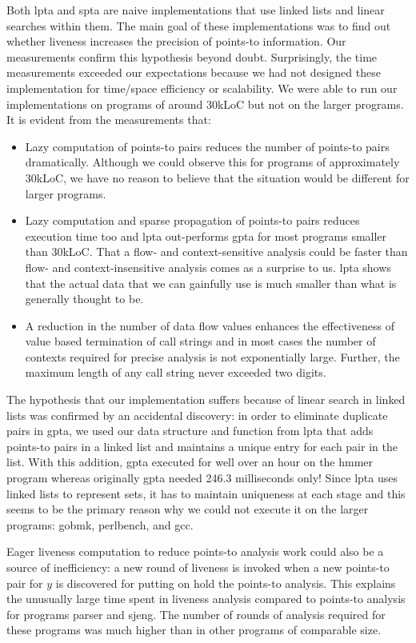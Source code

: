 \documentclass{llncs}
\begin{document}
Both lpta and spta are naive implementations that use linked lists and
linear searches within them.
The main goal of these implementations
was to find out whether liveness increases the precision of points-to
information. Our measurements confirm this hypothesis beyond doubt.
Surprisingly, the time measurements exceeded our expectations because we
had not designed these implementation for time/space efficiency or
scalability. We were able to run our implementations on programs of
around 30kLoC but not on the larger programs. It is evident from the
measurements that:
\begin{itemize}
\item Lazy computation of points-to pairs reduces the number of 
      points-to pairs dramatically. Although we
      could observe this for programs of approximately 30kLoC, we have no 
      reason to believe that the situation would be different for larger programs.
\item Lazy computation and sparse propagation of points-to pairs reduces 
      execution time too and lpta out-performs gpta for most programs smaller than 30kLoC.
      That a flow- and context-sensitive analysis could be faster than
      flow- and context-insensitive analysis comes as a surprise to
      us. lpta shows that the actual data that we can gainfully use is
      much smaller than what is generally thought to be.
\item A reduction in the number of data flow values enhances the effectiveness of
      value based termination of call strings and in most cases the
      number of contexts required for precise analysis is not
      exponentially large.  Further, 
      the maximum length of any call string never exceeded two digits.
\end{itemize}

The hypothesis that our implementation suffers because of
linear search in linked lists
was confirmed by an accidental discovery: in order to eliminate
duplicate pairs in gpta, we used our data structure and function
from lpta that adds points-to pairs in a linked list and maintains
a unique entry for each pair in the list. With this addition, gpta
executed for well over an hour on the hmmer program
whereas originally gpta needed 246.3 milliseconds only!
Since lpta uses linked lists to represent sets, it has to maintain
uniqueness at each stage and this seems to be the primary reason why we
could not execute it on the larger programs: gobmk, perlbench, and gcc.

Eager liveness computation to reduce points-to analysis work could also
be a source of inefficiency: a new round of liveness is invoked when
a new points-to pair for $y$ is discovered for  putting on hold
the points-to analysis. This explains the unusually large time spent in liveness
analysis  compared to points-to analysis
for programs parser and sjeng. The number of 
rounds of analysis required for these programs was much higher than in other programs
of comparable size.
\end{document}
